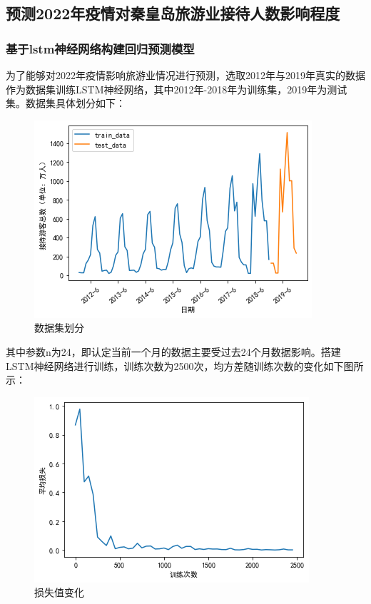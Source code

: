 	
	\subsection{预测2022年疫情对秦皇岛旅游业接待人数影响程度}
		\subsubsection{基于lstm神经网络构建回归预测模型}
		为了能够对2022年疫情影响旅游业情况进行预测，选取2012年与2019年真实的数据作为数据集训练LSTM神经网络，其中2012年-2018年为训练集，2019年为测试集。数据集具体划分如下：	
			\begin{figure}[h]
			\centering
			\includegraphics[scale=0.6,angle=0]{images/16.png}
			\caption{数据集划分}
			\label{16}
		\end{figure}
	
	其中参数n为24，即认定当前一个月的数据主要受过去24个月数据影响。搭建LSTM神经网络进行训练，训练次数为2500次，均方差随训练次数的变化如下图所示：\begin{figure}[h]
		\centering
		\includegraphics[scale=0.6,angle=0]{images/17.png}
		\caption{损失值变化}
		\label{17}
	\end{figure}

